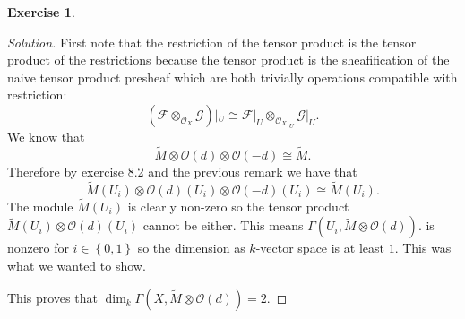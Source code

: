\documentclass{article}
\renewcommand{\qedsymbol}{\raisebox{-0.5cm}{}}
\newcommand{\sheaf}{\mathcal{O}}
\newcommand{\set}[1]{\left\{#1\right\}}
\newenvironment{solution}{\begin{proof}[Solution]\renewcommand\qedsymbol{}}{\end{proof}}
\theoremstyle{definition}
\newtheorem{question}{Exercise}
\begin{document}
\begin{question}
\begin{enumerate}[(a)]
\begin{solution}
                  First note that the restriction of the tensor product is the
                  tensor product of the restrictions because the tensor product
                  is the sheafification of the naive tensor product presheaf
                  which are both trivially operations compatible with
                  restriction:
                  \[
                      (\mathcal{F}\otimes_{\sheaf_{X}}\mathcal{G})|_{U}\cong\mathcal{F}|_{U}\otimes_{\sheaf_{X}|_{U}}\mathcal{G}|_{U}.
                  \]
                  We know that
                  \[
                      \tilde{M}\otimes\sheaf(d)\otimes\sheaf(-d)\cong\tilde{M}.
                  \]
                  Therefore by exercise 8.2 and the previous remark we have that
                  \[
                      \tilde{M}(U_{i})\otimes\sheaf(d)(U_{i})\otimes\sheaf(-d)(U_{i})\cong\tilde{M}(U_{i}).
                  \]
                  The module \(\tilde{M}(U_{i})\) is clearly non-zero so the
                  tensor product \(\tilde{M}(U_{i})\otimes\sheaf(d)(U_{i})\)
                  cannot be either. This means
                  \(\Gamma(U_{i},\tilde{M}\otimes\sheaf(d)).\) is nonzero for
                  \(i\in\set{0,1}\) so the dimension as \(k\)-vector space is at
                  least \(1\). This was what we wanted to show.

                  This proves that
                  \(\dim_{k}\Gamma(X,\tilde{M}\otimes\sheaf(d))=2\).
              \end{solution}
    \end{enumerate}
\end{question}
\end{document}
